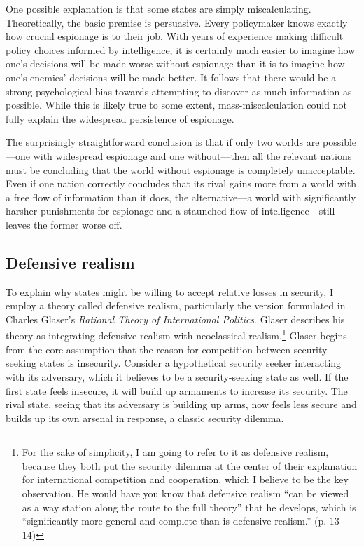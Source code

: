 \documentclass[12pt]{extarticle}
\begin{document}

One possible explanation is that some states are simply miscalculating. Theoretically, the basic premise is persuasive. Every policymaker knows exactly how crucial espionage is to their job. With years of experience making difficult policy choices informed by intelligence, it is certainly much easier to imagine how one's decisions will be made worse without espionage than it is to imagine how one's enemies' decisions will be made better. It follows that there would be a strong psychological bias towards attempting to discover as much information as possible. While this is likely true to some extent, mass-miscalculation could not fully explain the widespread persistence of espionage.

The surprisingly straightforward conclusion is that if only two worlds are possible---one with widespread espionage and one without---then all the relevant nations must be concluding that the world without espionage is completely unacceptable. Even if one nation correctly concludes that its rival gains more from a world with a free flow of information than it does, the alternative---a world with significantly harsher punishments for espionage and a staunched flow of intelligence---still leaves the former worse off.

\subsection{Defensive realism}
To explain why states might be willing to accept relative losses in security, I employ a theory called defensive realism, particularly the version formulated in Charles Glaser's \emph{Rational Theory of International Politics}. Glaser describes his theory as integrating defensive realism with neoclassical realism.\footnote{For the sake of simplicity, I am going to refer to it as defensive realism, because they both put the security dilemma at the center of their explanation for international competition and cooperation, which I believe to be the key observation. He would have you know that defensive realism \enquote{can be viewed as a way station along the route to the full theory} that he develops, which is \enquote{significantly more general and complete than is defensive realism.} (p. 13-14)} Glaser begins from the core assumption that the reason for competition between security-seeking states is insecurity. Consider a hypothetical security seeker interacting with its adversary, which it believes to be a security-seeking state as well. If the first state feels insecure, it will build up armaments to increase its security. The rival state, seeing that its adversary is building up arms, now feels less secure and builds up its own arsenal in response, a classic security dilemma.
\end{document}
